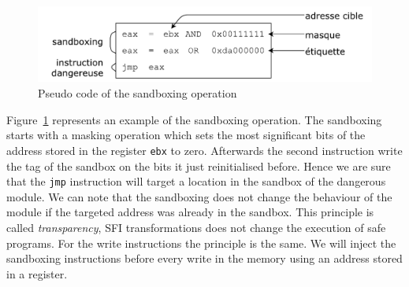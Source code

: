 \documentclass[11pt]{sdm}
\begin{document}
\begin{figure}[!ht]
\centering
\includegraphics[scale=0.5]{images/algo_sandboxing.pdf}
\caption{Pseudo code of the sandboxing operation}
\label{algo_sandbox}
\end{figure}


Figure~\ref{algo_sandbox} represents an example of the sandboxing operation. The sandboxing starts with a masking operation which sets the most significant bits of the address stored in the register \texttt{ebx} to zero. Afterwards the second instruction write the tag of the sandbox on the bits it just reinitialised before. Hence we are sure that the \texttt{jmp} instruction will target a location in the sandbox of the dangerous module. We can note that the sandboxing does not change the behaviour of the module if the targeted address was already in the sandbox. This principle is called \textit{transparency}, SFI transformations does not change the execution of safe programs. For the write instructions the principle is the same. We will inject the sandboxing instructions before every write in the memory using an address stored in a register.
\end{document}
